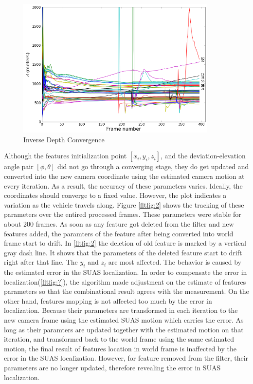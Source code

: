 \begin{figure}[h]
\centering
\includegraphics[width=10cm, keepaspectratio=true]{./Figures/fltfig/cut1/Figure10.png}
\caption{Inverse Depth Convergence}
\label{fltfig:1}
\end{figure}

Although the features initialization point $[x_i, y_i, z_i]$, and the
deviation-elevation angle pair $[\phi, \theta]$ did not go through a
converging stage, they do get updated and converted into the new
camera coordinate using the estimated camera motion at every
iteration. As a result, the accuracy of these parameters varies.
Ideally, the coordinates should converge to a fixed value. However,
the plot indicates a variation as the vehicle travels along. Figure
\ref{fltfig:2} shows the tracking of these parameters over the entired
processed frames.
These parameters were stable for about 200 frames. As soon as any
feature got deleted from the filter and new features added, the
paramters of the feature after being converted into world
frame start to drift. In \ref{fltfig:2} the deletion of old feature is
marked by a vertical gray dash line. It shows that the parameters of
the deleted feature start to drift right after that line. The $y_i$
and $z_i$ are most affected. The behavior is caused by the estimated
error in the SUAS localization. In order to compensate the error in
localization(\ref{fltfig:?}), the algorithm made adjustment on the
estimate of  features parameters so that the combinational result
agrees with the measurement. On the other hand, features mapping is
not affected too much by the error in localization. Because their
parameters are transformed in each iteration to the new camera frame
using the estimated SUAS motion which carries the error. As long as
their paramters are updated together with the estimated motion on that
iteration, and transformed back to the world frame using the same
estimated motion, the final result of features location in world frame
is inaffected by the error in the SUAS localization. However, for
feature removed from the filter, their parameters are no longer
updated, therefore revealing the error in SUAS localization. 
 
